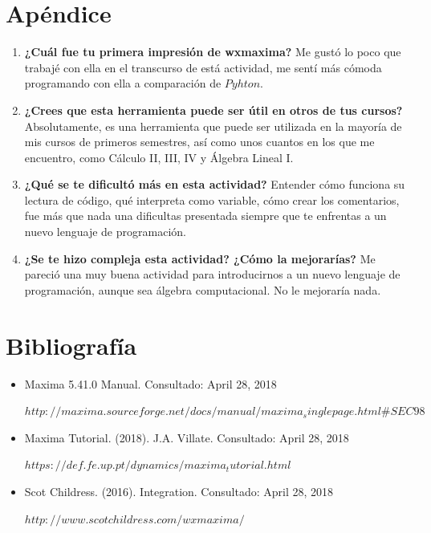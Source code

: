 \documentclass{article}
\begin{document}
\section{Apéndice}
\begin{enumerate}
\item \textbf{¿Cuál fue tu primera impresión de wxmaxima?} Me gustó lo poco que trabajé con ella en el transcurso de está actividad, me sentí más cómoda programando con ella a comparación de $Pyhton$.

\item\textbf{¿Crees que esta herramienta puede ser útil en otros de tus cursos?} Absolutamente, es una herramienta que puede ser utilizada en la mayoría de mis cursos de primeros semestres, así como unos cuantos en los que me encuentro, como Cálculo II, III, IV y Álgebra Lineal I.


\item\textbf{¿Qué se te dificultó más en esta actividad?} Entender cómo funciona su lectura de código, qué interpreta como variable, cómo crear los comentarios, fue más que nada una dificultas presentada siempre que te enfrentas a un nuevo lenguaje de programación.

\item\textbf{¿Se te hizo compleja esta actividad? ¿Cómo la mejorarías?} Me pareció una muy buena actividad para introducirnos a un nuevo lenguaje de programación, aunque sea álgebra computacional. No le mejoraría nada.
\end{enumerate}


\section{Bibliografía}
\begin{itemize}
\item Maxima 5.41.0 Manual. Consultado: April 28, 2018

$http://maxima.sourceforge.net/docs/manual/maxima_singlepage.html\#SEC98$

\item Maxima Tutorial. (2018). J.A. Villate. Consultado: April 28, 2018

$https://def.fe.up.pt/dynamics/maxima_tutorial.html$

\item Scot Childress. (2016). Integration. Consultado: April 28, 2018

$http://www.scotchildress.com/wxmaxima/$

\end{itemize}
\end{document}
